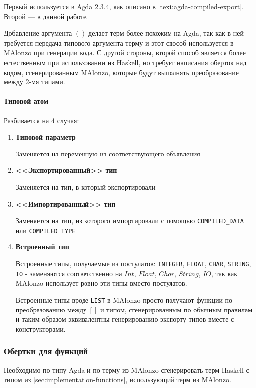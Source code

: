 Первый используется в Agda 2.3.4, как описано в \ref{text:agda-compiled-export}.
Второй --- в данной работе.

Добавление аргумента \(()\) делает терм более похожим на Agda, так как в ней
требуется передача типового аргумента терму и этот способ используется в
MAlonzo при генерации кода. С другой стороны, второй способ является более
естественным при использовании из Haskell, но требует написания оберток над
кодом, сгенерированным MAlonzo, которые будут выполнять преобразование между
2-мя типами.

\paragraph{Типовой атом}
Разбивается на 4 случая:
\begin{enumerate}
\item \textbf{Типовой параметр}

Заменяется на переменную из соответствующего объявления
\item \textbf{<<Экспортированный>> тип}

Заменяется на тип, в который экспортировали
\item \textbf{<<Импортированный>> тип}

Заменяется на тип, из которого импортировали с помощью \texttt{COMPILED\_DATA} или
\texttt{COMPILED\_TYPE}
\item \textbf{Встроенный тип}

Встроенные типы, получаемые из постулатов: \texttt{INTEGER}, \texttt{FLOAT},
\texttt{CHAR}, \texttt{STRING}, \texttt{IO} - заменяются соответственно на
\(Int\), \(Float\), \(Char\), \(String\), \(IO\), так как MAlonzo использует
ровно эти типы вместо постулатов.

Встроенные типы вроде \texttt{LIST} в MAlonzo просто получают функции
по преобразованию между \([]\) и типом, сгенерированным по обычным правилам
и таким образом эквивалентны генерированию экспорту типов вместе с конструкторами.
\end{enumerate}

\subsubsection{Обертки для функций}\label{sec:implementation-wrappers}

Необходимо по типу Agda и по терму из MAlonzo сгенерировать терм Haskell с типом
из \ref{sec:implementation-functions}, использующий терм из MAlonzo.

